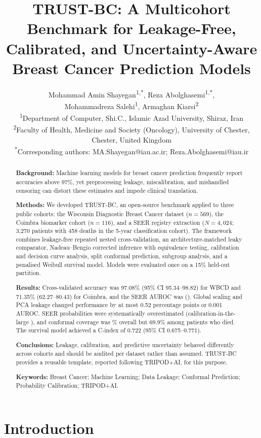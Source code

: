 \documentclass[11pt,a4paper]{article}
\title{\textbf{TRUST-BC: A Multicohort Benchmark for Leakage-Free, Calibrated, and Uncertainty-Aware Breast Cancer Prediction Models}}
\author{Mohammad Amin Shayegan\textsuperscript{1,*}, Reza Abolghasemi\textsuperscript{1,*},\\ Mohammadreza Salehi\textsuperscript{1}, Armaghan Kiarsi\textsuperscript{2}\\[6pt]
\small\textsuperscript{1}Department of Computer, Shi.C., Islamic Azad University, Shiraz, Iran\\
\small\textsuperscript{2}Faculty of Health, Medicine and Society (Oncology), University of Chester, Chester, United Kingdom\\
\small\textsuperscript{*}Corresponding authors: MA.Shayegan@iau.ac.ir; Reza.Abolghasemi@iau.ir}
\date{}
\begin{document}
\maketitle\thispagestyle{fancy}

\begin{abstract}\label{sec:abstract}
\noindent\textbf{Background:} Machine learning models for breast cancer prediction frequently report accuracies above 97\%, yet preprocessing leakage, miscalibration, and mishandled censoring can distort these estimates and impede clinical translation.

\noindent\textbf{Methods:} We developed TRUST-BC, an open-source benchmark applied to three public cohorts: the Wisconsin Diagnostic Breast Cancer dataset ($n=569$), the Coimbra biomarker cohort ($n=116$), and a SEER registry extraction ($N=4{,}024$; 3,270 patients with 458 deaths in the 5-year classification cohort). The framework combines leakage-free repeated nested cross-validation, an architecture-matched leaky comparator, Nadeau--Bengio corrected inference with equivalence testing, calibration and decision curve analysis, split conformal prediction, subgroup analysis, and a penalised Weibull survival model. Models were evaluated once on a 15\% held-out partition.

\noindent\textbf{Results:} Cross-validated accuracy was 97.08\% (95\% CI 95.34--98.82) for WBCD and 71.35\% (62.27--80.43) for Coimbra, and the SEER AUROC was \seerUniAUC{} (\seerUniCIs). Global scaling and PCA leakage changed performance by at most 0.52 percentage points or 0.001 AUROC. SEER probabilities were systematically overestimated (calibration-in-the-large \seerCITL), and conformal coverage was \seerConfCov\% overall but 69.9\% among patients who died. The survival model achieved a C-index of 0.722 (95\% CI 0.675--0.771).

\noindent\textbf{Conclusions:} Leakage, calibration, and predictive uncertainty behaved differently across cohorts and should be audited per dataset rather than assumed. TRUST-BC provides a reusable template, reported following TRIPOD+AI, for this purpose.

\medskip
\noindent\textbf{Keywords:} Breast Cancer; Machine Learning; Data Leakage; Conformal Prediction; Probability Calibration; TRIPOD+AI.
\end{abstract}

\section{Introduction}\label{sec:introduction}
\end{document}
